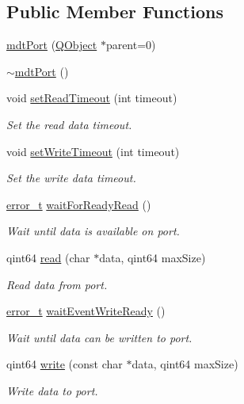 \subsection*{Public Member Functions}
\begin{DoxyCompactItemize}
\item 
\hyperlink{classmdt_port_ac466eac9d1a54ea0e04c998660ad75ec}{mdt\-Port} (\hyperlink{class_q_object}{Q\-Object} $\ast$parent=0)
\item 
\hyperlink{classmdt_port_aa19f56493000459083df371be57f67aa}{$\sim$mdt\-Port} ()
\item 
void \hyperlink{classmdt_port_aa77b266f23744f1b53ae589f986be101}{set\-Read\-Timeout} (int timeout)
\begin{DoxyCompactList}\small\item\em Set the read data timeout. \end{DoxyCompactList}\item 
void \hyperlink{classmdt_port_a2acb6e7bedacdadf78ee735dc611abfa}{set\-Write\-Timeout} (int timeout)
\begin{DoxyCompactList}\small\item\em Set the write data timeout. \end{DoxyCompactList}\item 
\hyperlink{classmdt_abstract_port_ad4121bb930c95887e77f8bafa065a85e}{error\-\_\-t} \hyperlink{classmdt_port_a84594fdb56cd455a366c69b0a9228020}{wait\-For\-Ready\-Read} ()
\begin{DoxyCompactList}\small\item\em Wait until data is available on port. \end{DoxyCompactList}\item 
qint64 \hyperlink{classmdt_port_ad8a196bb21b6ca76dffb068a1692904a}{read} (char $\ast$data, qint64 max\-Size)
\begin{DoxyCompactList}\small\item\em Read data from port. \end{DoxyCompactList}\item 
\hyperlink{classmdt_abstract_port_ad4121bb930c95887e77f8bafa065a85e}{error\-\_\-t} \hyperlink{classmdt_port_a85e77a391f6f5782428beb2e6aee52f8}{wait\-Event\-Write\-Ready} ()
\begin{DoxyCompactList}\small\item\em Wait until data can be written to port. \end{DoxyCompactList}\item 
qint64 \hyperlink{classmdt_port_a62f4a6f2c547d40d3743ce893e0f64d6}{write} (const char $\ast$data, qint64 max\-Size)
\begin{DoxyCompactList}\small\item\em Write data to port. \end{DoxyCompactList}\end{DoxyCompactItemize}

